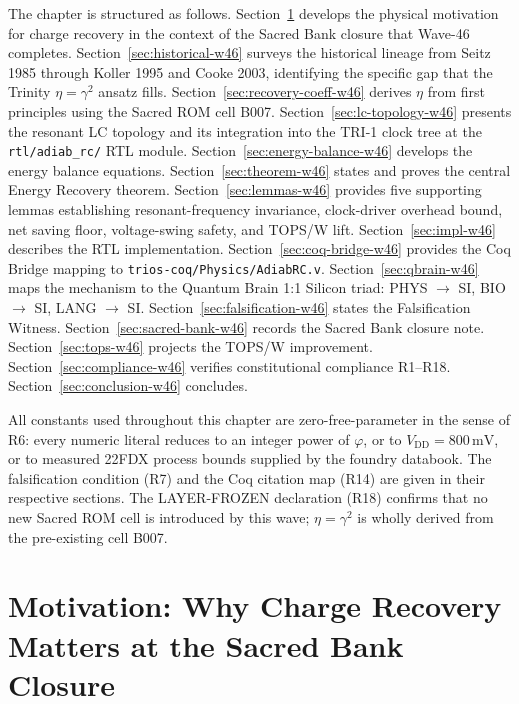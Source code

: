 The chapter is structured as follows.
Section~\ref{sec:motivation-w46} develops the physical motivation for charge
recovery in the context of the Sacred Bank closure that Wave-46 completes.
Section~\ref{sec:historical-w46} surveys the historical lineage from Seitz 1985
through Koller 1995 and Cooke 2003, identifying the specific gap that the
Trinity $\eta = \gamma^{2}$ ansatz fills.
Section~\ref{sec:recovery-coeff-w46} derives $\eta$ from first principles using
the Sacred ROM cell B007.
Section~\ref{sec:lc-topology-w46} presents the resonant LC topology and its
integration into the TRI-1 clock tree at the \texttt{rtl/adiab\_rc/} RTL
module.
Section~\ref{sec:energy-balance-w46} develops the energy balance equations.
Section~\ref{sec:theorem-w46} states and proves the central Energy Recovery
theorem.
Section~\ref{sec:lemmas-w46} provides five supporting lemmas establishing
resonant-frequency invariance, clock-driver overhead bound, net saving floor,
voltage-swing safety, and TOPS/W lift.
Section~\ref{sec:impl-w46} describes the RTL implementation.
Section~\ref{sec:coq-bridge-w46} provides the Coq Bridge mapping to
\texttt{trios-coq/Physics/AdiabRC.v}.
Section~\ref{sec:qbrain-w46} maps the mechanism to the Quantum Brain 1:1 Silicon
triad: PHYS $\to$ SI, BIO $\to$ SI, LANG $\to$ SI.
Section~\ref{sec:falsification-w46} states the Falsification Witness.
Section~\ref{sec:sacred-bank-w46} records the Sacred Bank closure note.
Section~\ref{sec:tops-w46} projects the TOPS/W improvement.
Section~\ref{sec:compliance-w46} verifies constitutional compliance R1--R18.
Section~\ref{sec:conclusion-w46} concludes.

All constants used throughout this chapter are zero-free-parameter in the sense
of R6: every numeric literal reduces to an integer power of $\varphi$, or to
$V_{\mathrm{DD}} = 800\,\text{mV}$, or to measured 22FDX process bounds
supplied by the foundry databook.
The falsification condition (R7) and the Coq citation map (R14) are given in
their respective sections.
The LAYER-FROZEN declaration (R18) confirms that no new Sacred ROM cell is
introduced by this wave; $\eta = \gamma^{2}$ is wholly derived from the
pre-existing cell B007.

\section{Motivation: Why Charge Recovery Matters at the Sacred Bank Closure}
\label{sec:motivation-w46}

